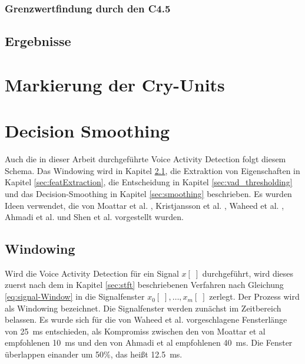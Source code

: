\subsubsection{Grenzwertfindung durch den C4.5}

\subsection{Ergebnisse}

\section{Markierung der Cry-Units}
\label{sec:marking_cry-units_new}

\section{Decision Smoothing}
\label{sec:decision_smoothing_new}

Auch die in dieser Arbeit durchgeführte Voice Activity Detection folgt diesem Schema. Das Windowing wird in Kapitel \ref{sec:windowing}, die Extraktion von Eigenschaften in Kapitel \ref{sec:featExtraction}, die Entscheidung in Kapitel \ref{sec:vad_thresholding} und das Decision-Smoothing in Kapitel \ref{sec:smoothing} beschrieben. Es wurden Ideen verwendet, die von  Moattar et al. \cite{vad_Easy}, Kristjansson et al. \cite{vad_Lisboa}, Waheed et al. \cite{vad_entropy}, Ahmadi et al. \cite{vad_ceps} und Shen et al.\cite{vad_entropie02} vorgestellt wurden.

\subsection{Windowing}
\label{sec:windowing}

Wird die Voice Activity Detection für ein Signal $x[\;]$ durchgeführt, wird dieses zuerst nach dem in Kapitel \ref{sec:stft} beschriebenen Verfahren nach Gleichung \ref{eq:signal-Window} in die Signalfenster $x_0[\;] , \ldots , x_m[\;]$ zerlegt. Der Prozess wird als \glqq Windowing\grqq{} bezeichnet. Die Signalfenster werden zunächst im Zeitbereich belassen. Es wurde sich für die von Waheed et al. \cite{vad_entropy} vorgeschlagene Fensterlänge von \SI{25}{\milli\second} entschieden, als Kompromiss zwischen den von Moattar et al\cite{vad_Easy} empfohlenen \SI{10}{\milli\second} und den von Ahmadi et al \cite{vad_ceps} empfohlenen \SI{40}{\milli\second}. Die Fenster überlappen einander um 50\%, das heißt \SI{12.5}{\milli\second}.

